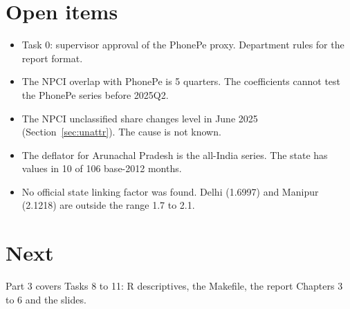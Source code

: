 \documentclass[11pt,a4paper]{article}
\begin{document}
\section{Open items}
\begin{itemize}
\item Task 0: supervisor approval of the PhonePe proxy. Department rules for the report format.
\item The NPCI overlap with PhonePe is 5 quarters. The coefficients cannot test the PhonePe series before 2025Q2.
\item The NPCI unclassified share changes level in June 2025 (Section~\ref{sec:unattr}). The cause is not known.
\item The deflator for Arunachal Pradesh is the all-India series. The state has values in 10 of 106 base-2012 months.
\item No official state linking factor was found. Delhi (1.6997) and Manipur (2.1218) are outside the range 1.7 to 2.1.
\end{itemize}

\section{Next}
Part 3 covers Tasks 8 to 11: R descriptives, the Makefile, the report Chapters 3 to 6 and the slides.



\end{document}
